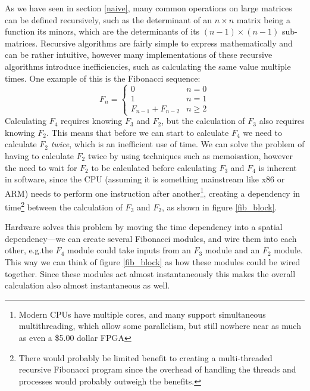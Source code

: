 \documentclass[12pt]{article}
\begin{document}
As we have seen in section \ref{naive}, many common operations on large matrices can be defined recursively, such as the determinant of an $n \times n$ matrix being a function its minors, which are the determinants of its $(n-1) \times (n-1)$ sub-matrices. Recursive algorithms are fairly simple to express mathematically and can be rather intuitive, however many implementations of these recursive algorithms introduce inefficiencies, such as calculating the same value multiple times. One example of this is the Fibonacci sequence:
\begin{equation}
	F_n = 
	\begin{cases}
		0 & n = 0\\
		1 & n = 1 \\
		F_{n-1} + F_{n-2} & n \ge 2
	\end{cases}
\end{equation}
Calculating $F_4$ requires knowing $F_3$ and $F_2$, but the calculation of $F_3$ also requires knowing $F_2$. This means that before we can start to calculate $F_4$ we need to calculate $F_2$ \emph{twice}, which is an inefficient use of time. We can solve the problem of having to calculate $F_2$ twice by using techniques such as memoisation, however the need to wait for $F_2$ to be calculated before calculating $F_3$ and $F_4$ is inherent in software, since the CPU (assuming it is something mainstream like x86 or ARM) needs to perform one instruction after another\footnote{Modern CPUs have multiple cores, and many support simultaneous multithreading, which allow some parallelism, but still nowhere near as much as even a \$5.00 dollar FPGA}, creating a dependency in time\footnote{There would probably be limited benefit to creating a multi-threaded recursive Fibonacci program since the overhead of handling the threads and processes would probably outweigh the benefits.} between the calculation of $F_3$ and $F_2$, as shown in figure \ref{fib_block}.

Hardware solves this problem by moving the time dependency into a spatial dependency---we can create several Fibonacci modules, and wire them into each other, e.g.\@ the $F_4$ module could take inputs from an $F_3$ module and an $F_2$ module. This way we can think of figure \ref{fib_block} as how these modules could be wired together. Since these modules act almost instantaneously this makes the overall calculation also almost instantaneous as well.
\end{document}
